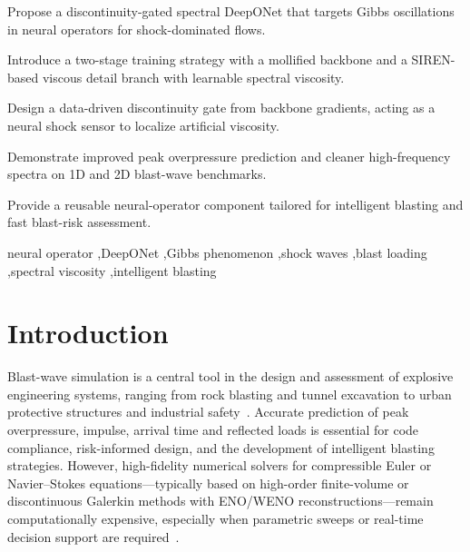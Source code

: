 \documentclass[a4paper,fleqn]{cas-dc}
\begin{document}

\begin{highlights}
\item Propose a discontinuity-gated spectral DeepONet that targets Gibbs oscillations in neural operators for shock-dominated flows.
\item Introduce a two-stage training strategy with a mollified backbone and a SIREN-based viscous detail branch with learnable spectral viscosity.
\item Design a data-driven discontinuity gate from backbone gradients, acting as a neural shock sensor to localize artificial viscosity.
\item Demonstrate improved peak overpressure prediction and cleaner high-frequency spectra on 1D and 2D blast-wave benchmarks.
\item Provide a reusable neural-operator component tailored for intelligent blasting and fast blast-risk assessment.
\end{highlights}


\begin{keywords}
neural operator \sep DeepONet \sep Gibbs phenomenon \sep shock waves \sep blast loading \sep spectral viscosity \sep intelligent blasting
\end{keywords}

\maketitle
\section{Introduction}
\label{sec:intro}

Blast-wave simulation is a central tool in the design and assessment of explosive engineering systems, ranging from rock blasting and tunnel excavation to urban protective structures and industrial safety~\citep{Toro1999Riemann,Neuberger2015BlastCFD}.
Accurate prediction of peak overpressure, impulse, arrival time and reflected loads is essential for code compliance, risk-informed design, and the development of intelligent blasting strategies.
However, high-fidelity numerical solvers for compressible Euler or Navier--Stokes equations---typically based on high-order finite-volume or discontinuous Galerkin methods with ENO/WENO reconstructions---remain computationally expensive, especially when parametric sweeps or real-time decision support are required~\citep{ShuOsher1988ENO,JiangShu1996WENO}.
\end{document}
